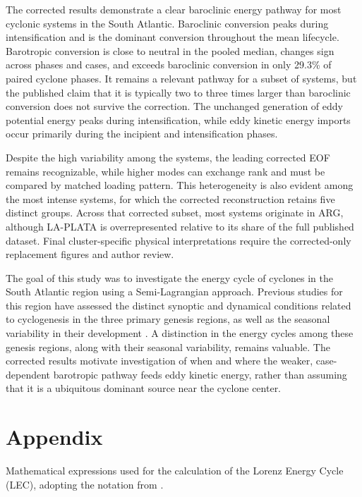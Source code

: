 \documentclass[pdflatex,sn-chicago]{sn-jnl}%
\theoremstyle{plain}
\theoremstyle{definition}
\theoremstyle{remark}
\theoremstyle{definition}
\begin{document}
The corrected results demonstrate a clear baroclinic energy pathway for most cyclonic systems in the South Atlantic. Baroclinic conversion peaks during intensification and is the dominant conversion throughout the mean lifecycle. Barotropic conversion is close to neutral in the pooled median, changes sign across phases and cases, and exceeds baroclinic conversion in only 29.3\% of paired cyclone phases. It remains a relevant pathway for a subset of systems, but the published claim that it is typically two to three times larger than baroclinic conversion does not survive the correction. The unchanged generation of eddy potential energy peaks during intensification, while eddy kinetic energy imports occur primarily during the incipient and intensification phases.

Despite the high variability among the systems, the leading corrected EOF remains recognizable, while higher modes can exchange rank and must be compared by matched loading pattern. This heterogeneity is also evident among the most intense systems, for which the corrected reconstruction retains five distinct groups. Across that corrected subset, most systems originate in ARG, although LA-PLATA is overrepresented relative to its share of the full published dataset. Final cluster-specific physical interpretations require the corrected-only replacement figures and author review.

The goal of this study was to investigate the energy cycle of cyclones in the South Atlantic region using a Semi-Lagrangian approach. Previous studies for this region have assessed the distinct synoptic and dynamical conditions related to cyclogenesis in the three primary genesis regions, as well as the seasonal variability in their development \citep{gramcianinov2019properties, crespo2021potential}. A distinction in the energy cycles among these genesis regions, along with their seasonal variability, remains valuable. The corrected results motivate investigation of when and where the weaker, case-dependent barotropic pathway feeds eddy kinetic energy, rather than assuming that it is a ubiquitous dominant source near the cyclone center.


\backmatter



\section*{Appendix}


Mathematical expressions used for the calculation of the Lorenz Energy Cycle (LEC), adopting the notation from \citet{michaelides1987limited}. 
\end{document}

